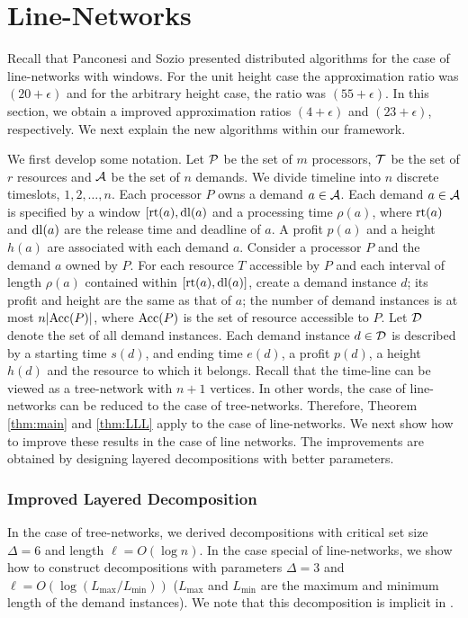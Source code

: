 \documentclass[11pt]{article}
\newcommand{\calP} {{\cal P}}
\newcommand{\calA} {{\cal A}}
\newcommand{\calT} {{\cal T}}
\newcommand{\calD} {{\cal D}}
\newcommand{\Acc} {{\rm Acc}}
\newcommand{\rt} {{\rm rt}}
\newcommand{\dl} {{\rm dl}}
\begin{document}
\section{Line-Networks}
Recall that Panconesi and Sozio \cite{Pancj} presented distributed algorithms
for the case of line-networks with windows. For the unit height case the approximation ratio was $(20+\epsilon)$
and for the arbitrary height case, the ratio was $(55+\epsilon)$. 
In this section, we obtain a improved approximation ratios $(4+\epsilon)$ and $(23+\epsilon)$, respectively.
We next explain the new algorithms within our framework.

We first develop some notation. Let $\calP$ be the set of $m$ processors, $\calT$ be the set of $r$ resources
and $\calA$ be the set of $n$ demands.
We divide timeline into $n$ discrete timeslots, $1,2,\ldots, n$. Each processor $P$ owns a demand $a\in \calA$.
Each demand $a\in \calA$ is specified by a window $[\rt(a),\dl(a)$ and a processing time $\rho(a)$,
where $\rt(a)$ and $\dl(a)$ are the release time and deadline of $a$.
A profit $p(a)$ and a height $h(a)$ are associated with each demand $a$. 
Consider a processor $P$ and the demand $a$ owned by $P$.
For each resource $T$ accessible by $P$ and each interval of length $\rho(a)$ contained within $[\rt(a), \dl(a)]$,
create a demand instance $d$; its profit and height are the same as that of $a$;
the number of demand instances is at most $n|\Acc(P)|$, where $\Acc(P)$
is the set of resource accessible to $P$. Let $\calD$ denote the set of all demand instances.
Each demand instance $d\in \calD$ is described by a starting time $s(d)$, and ending time $e(d)$,
a profit $p(d)$, a height $h(d)$ and the resource to which it belongs.
Recall that the time-line can be viewed as a tree-network with $n+1$ vertices.
In other words, the case of line-networks can be reduced to the case of tree-networks.
Therefore, Theorem \ref{thm:main} and \ref{thm:LLL} apply to the case of line-networks.
We next show how to improve these results in the case of line networks.
The improvements are obtained by designing layered decompositions with better parameters.

\subsubsection*{Improved Layered Decomposition}
In the case of tree-networks, we derived decompositions with critical set size $\Delta=6$
and length $\ell= O(\log n)$. In the case special of line-networks, we show how to construct
decompositions with parameters $\Delta=3$ and $\ell = O(\log(L_{\max}/L_{\min}))$ ($L_{\max}$ and $L_{\min}$
are the maximum and minimum length of the demand instances).
We note that this decomposition is implicit in \cite{Pancj}.
\end{document}
